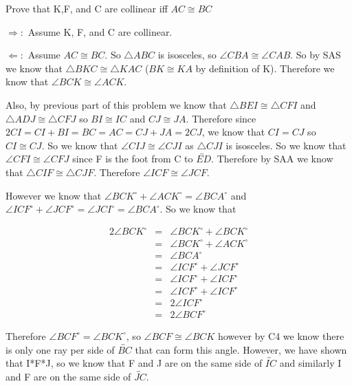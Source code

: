 \documentclass[12pt,letterpaper]{article}
\newcommand{\Proof}{\noindent {\bf Proof: }}
\begin{document}
Prove that K,F, and C are collinear iff $AC \cong BC$\\

\Proof

$\Rightarrow:$  Assume K, F, and C are collinear.




$\Leftarrow:$  Assume $AC \cong BC$.  So $\triangle ABC$ is isosceles, so $\angle CBA \cong \angle CAB$.  So by SAS we know that $\triangle BKC \cong \triangle KAC$ ($BK \cong KA$ by definition of K).  Therefore we know that $\angle BCK \cong \angle ACK$. 

Also, by previous part of this problem we know that $\triangle BEI \cong \triangle CFI$ and $\triangle ADJ \cong \triangle CFJ$ so $BI \cong IC$ and $CJ \cong JA$.  Therefore since $2CI = CI + BI = BC = AC = CJ + JA = 2CJ$, we know that $CI = CJ$ so $CI \cong CJ$.  So we know that $\angle CIJ \cong \angle CJI$ as $\triangle CJI$ is isosceles. So we know that $\angle CFI \cong \angle CFJ$ since F is the foot from C to $\overleftrightarrow{ED}$.  Therefore by SAA we know that $\triangle CIF \cong \triangle CJF$. Therefore 
$\angle ICF \cong \angle JCF$. 

However we know that $\angle BCK^\circ + \angle ACK^\circ = \angle BCA^\circ$ and $\angle ICF^\circ + \angle JCF^\circ = \angle JCI^\circ = \angle BCA^\circ$.  So we know that 

\begin{eqnarray*}
2\angle BCK^\circ &=& \angle BCK^\circ + \angle BCK^\circ\\
&=& \angle BCK^\circ + \angle ACK^\circ \\
&=& \angle BCA^\circ \\
&=& \angle ICF^\circ + \angle JCF^\circ\\
&=& \angle ICF^\circ + \angle ICF^\circ\\
&=& \angle ICF^\circ + \angle ICF^\circ\\
&=& 2\angle ICF^\circ\\
&=& 2\angle BCF^\circ
\end{eqnarray*}

Therefore $\angle BCF^\circ = \angle BCK^\circ$, so $\angle BCF \cong \angle BCK$ however by C4 we know there is only one ray per side of $\overleftrightarrow{BC}$ that can form this angle.  However, we have shown that I*F*J, so we know that F and J are on the same side of $\overleftrightarrow{IC}$ and similarly I and F are on the same side of $\overleftrightarrow{JC}$.        
\end{document}
